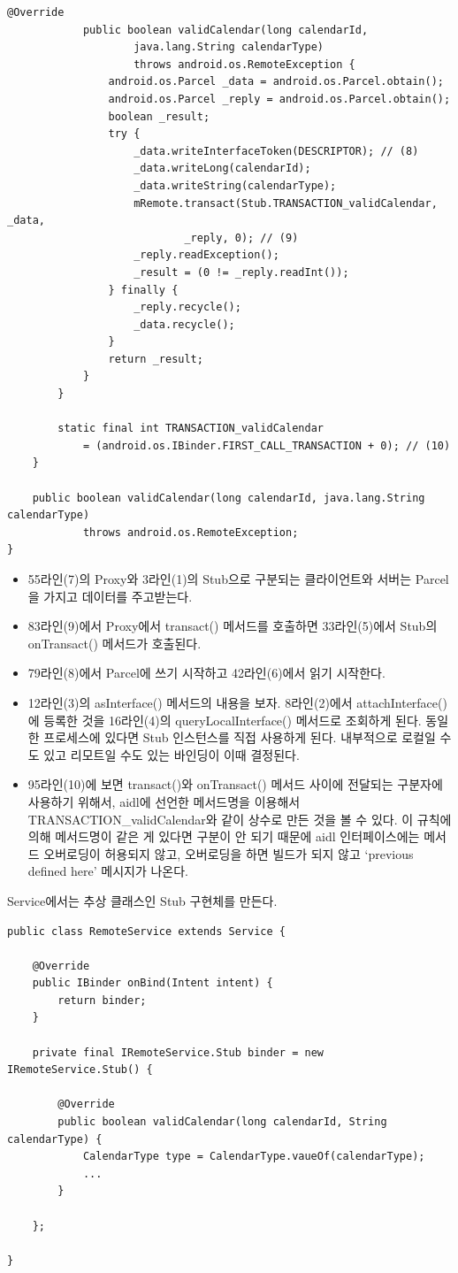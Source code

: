 \begin{lstlisting}[frame=single]
			@Override
			public boolean validCalendar(long calendarId,
					java.lang.String calendarType)
					throws android.os.RemoteException {
				android.os.Parcel _data = android.os.Parcel.obtain();
				android.os.Parcel _reply = android.os.Parcel.obtain();
				boolean _result;
				try {
					_data.writeInterfaceToken(DESCRIPTOR); // (8)
					_data.writeLong(calendarId);
					_data.writeString(calendarType);
					mRemote.transact(Stub.TRANSACTION_validCalendar, _data, 
							_reply, 0); // (9)
					_reply.readException();
					_result = (0 != _reply.readInt());
				} finally {
					_reply.recycle();
					_data.recycle();
				}
				return _result;
			}
		}

		static final int TRANSACTION_validCalendar 
			= (android.os.IBinder.FIRST_CALL_TRANSACTION + 0); // (10)
	}

	public boolean validCalendar(long calendarId, java.lang.String calendarType)
			throws android.os.RemoteException;
}
\end{lstlisting}
\begin{itemize}
\item 55라인(7)의 Proxy와 3라인(1)의 Stub으로 구분되는 클라이언트와 서버는 Parcel을 가지고 데이터를 주고받는다. 

\item 83라인(9)에서 Proxy에서 transact() 메서드를 호출하면 33라인(5)에서 Stub의 onTransact() 메서드가 호출된다.

\item 79라인(8)에서 Parcel에 쓰기 시작하고 42라인(6)에서 읽기 시작한다.

\item 12라인(3)의 asInterface() 메서드의 내용을 보자. 8라인(2)에서 attachInterface()에 등록한 것을 16라인(4)의 queryLocalInterface() 메서드로 조회하게 된다. 
동일한 프로세스에 있다면 Stub 인스턴스를 직접 사용하게 된다. 내부적으로 로컬일 수도 있고 리모트일 수도 있는 바인딩이 이때 결정된다.

\item 95라인(10)에 보면 transact()와 onTransact() 메서드 사이에 전달되는 구분자에 사용하기 위해서, aidl에 선언한 메서드명을 이용해서 TRANSACTION\_validCalendar와 같이 상수로 만든 것을 볼 수 있다. 
이 규칙에 의해 메서드명이 같은 게 있다면 구분이 안 되기 때문에 aidl 인터페이스에는 메서드 오버로딩이 허용되지 않고, 오버로딩을 하면 빌드가 되지 않고 `previous defined here' 메시지가 나온다.
\end{itemize}

Service에서는 추상 클래스인 Stub 구현체를 만든다.
\begin{lstlisting}[frame=single]
public class RemoteService extends Service {

 	@Override
    public IBinder onBind(Intent intent) {
		return binder;
	}
    	
	private final IRemoteService.Stub binder = new IRemoteService.Stub() {
	
		@Override
        public boolean validCalendar(long calendarId, String calendarType) {
			CalendarType type = CalendarType.vaueOf(calendarType);
            ...
        }
        
    }; 
    
}       	
\end{lstlisting}

